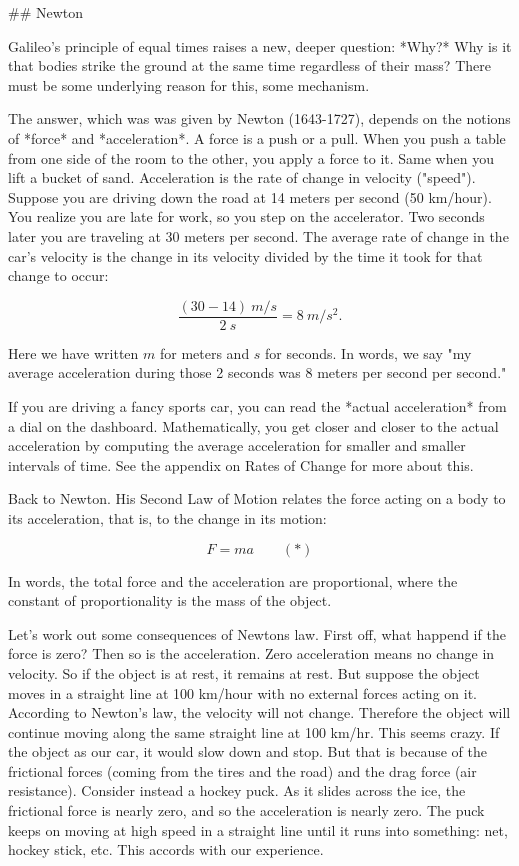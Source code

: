 ## Newton

Galileo's principle of equal times raises a new, deeper question: *Why?*
Why is it that bodies strike the ground at the same time regardless of their mass?  There must be some underlying reason for this, some mechanism.


The answer, which was was given by Newton (1643-1727), depends on the notions of *force* and *acceleration*.  A force is a push or a pull.  When you push a table from one side of the room to the other, you apply a force to it. Same when you lift a bucket of sand.  Acceleration is the rate of change in velocity ("speed").  Suppose you are driving down the road at 14 meters per second (50 km/hour).  You realize you are late for work, so you step on the accelerator.  Two seconds later you are traveling at 30 meters per second.  The average rate of change in the car's velocity is the change in its velocity divided by the time it took for that change to occur:

$$
\frac{(30 - 14) \ m/s}{2\ s} = 8\  m/s^2.
$$

Here we have written $m$ for meters and $s$ for seconds.   In words, we say "my average acceleration during those 2 seconds was 8 meters per second per second."  

If you are driving a fancy sports car, you can read the *actual acceleration* from a dial on the dashboard.  Mathematically, you get closer and closer to the actual acceleration by computing the average acceleration for smaller and smaller intervals of time.  See the appendix on Rates of Change for more about this.

Back to Newton.  His Second Law of Motion relates the force acting on a body to its acceleration, that is, to the change in its motion:

$$
F = ma \qquad (*)
$$

In words, the total force and the acceleration are proportional, where the constant of proportionality is the mass of the object. 

Let's work out some consequences of Newtons law. First off, what happend if the force is zero? Then so is the acceleration.  Zero acceleration means no change in velocity.  So if the object is at rest, it remains at rest.  But suppose the object moves in a straight line at 100 km/hour with no external forces acting on it.  According to Newton's law, the velocity will not change.  Therefore the object will continue moving along the same straight line at 100 km/hr.  This seems crazy.  If the object as our car, it would slow down and stop.  But that is because of the frictional forces (coming from the tires and the road) and the drag force (air resistance).  Consider instead a hockey puck.  As it slides across the ice, the frictional force is nearly zero, and so the acceleration is nearly zero. The puck keeps on moving at high speed in a straight line until it runs into something: net, hockey stick, etc.  This accords with our experience.

